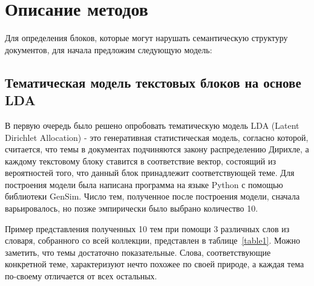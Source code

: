 \documentclass[14pt]{matmex-diploma-custom}
\begin{document}
\newpage
\section{Описание методов}
Для определения блоков, которые могут нарушать семантическую структуру документов, для начала предложим следующую модель:

\subsection{Тематическая модель текстовых блоков на основе LDA}
В первую очередь было решено опробовать тематическую модель LDA (Latent Dirichlet Allocation) - это генеративная статистическая модель, согласно которой, считается, что темы в документах подчиняются закону распределению Дирихле, а каждому текстовому блоку ставится в соответствие вектор, состоящий из вероятностей того, что данный блок принадлежит соответствующей теме. Для построения модели была написана программа на языке Python с помощью библиотеки GenSim. Число тем, полученное после построения модели, сначала варьировалось, но позже эмпирически было выбрано количество 10. 

Пример представления полученных 10 тем при помощи 3 различных слов из словаря, собранного со всей коллекции, представлен в таблице~\ref{table1}. Можно заметить, что темы достаточно показательные. Слова, соответствующие конкретной теме, характеризуют нечто похожее по своей природе, а каждая тема по-своему отличается от всех остальных.
\end{document}
